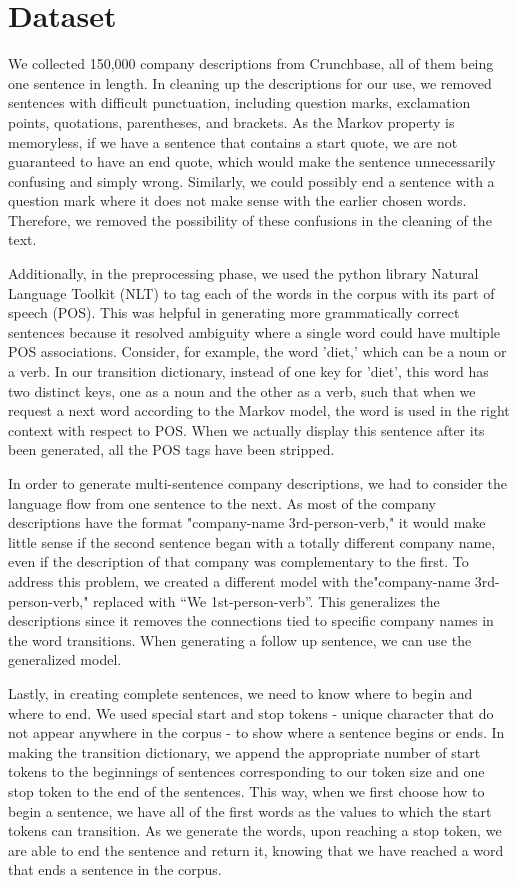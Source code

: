 \documentclass[11pt]{article}
\begin{document}
\section{Dataset}

We collected 150,000 company descriptions from Crunchbase, all of them being one sentence in length. In cleaning up the descriptions for our use, we removed sentences with difficult punctuation, including question marks, exclamation points, quotations, parentheses, and brackets. As the Markov property is memoryless, if we have a sentence that contains a start quote, we are not guaranteed to have an end quote, which would make the sentence unnecessarily confusing and simply wrong. Similarly, we could possibly end a sentence with a question mark where it does not make sense with the earlier chosen words. Therefore, we removed the possibility of these confusions in the cleaning of the text.

Additionally, in the preprocessing phase, we used the python library Natural Language Toolkit (NLT) to tag each of the words in the corpus with its part of speech (POS). This was helpful in generating more grammatically correct sentences because it resolved ambiguity where a single word could have multiple POS associations. Consider, for example, the word 'diet,' which can be a noun or a verb. In our transition dictionary, instead of one key for 'diet', this word has two distinct keys, one as a noun and the other as a verb, such that when we request a next word according to the Markov model, the word is used in the right context with respect to POS. When we actually display this sentence after its been generated, all the POS tags have been stripped. 

In order to generate multi-sentence company descriptions, we had to consider the language flow from one sentence to the next. As most of the company descriptions have the format "company-name 3rd-person-verb," it would make little sense if the second sentence began with a totally different company name, even if the description of that company was complementary to the first. To address this problem, we created a different model with the"company-name 3rd-person-verb," replaced with ``We 1st-person-verb''. This generalizes the descriptions since it removes the connections tied to specific company names in the word transitions. When generating a follow up sentence, we can use the generalized model.

Lastly, in creating complete sentences, we need to know where to begin and where to end. We used special start and stop tokens - unique character that do not appear anywhere in the corpus - to show where a sentence begins or ends. In making the transition dictionary, we append the appropriate number of start tokens to the beginnings of sentences corresponding to our token size and one stop token to the end of the sentences. This way, when we first choose how to begin a sentence, we have all of the first words as the values to which the start tokens can transition. As we generate the words, upon reaching a stop token, we are able to end the sentence and return it, knowing that we have reached a word that ends a sentence in the corpus.
\end{document}
